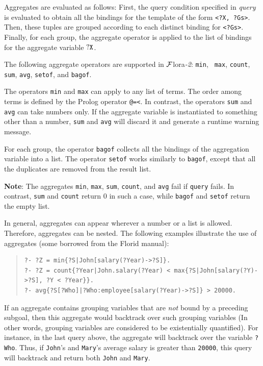 \documentclass[11pt]{article}
\newcommand{\FLSYSTEM}{{\mbox{\sc ${\cal F}${lora}\rm\emph{-2}}}\xspace}
\newcommand{\FLORID}{{\mbox{\sc Florid}}\xspace}
\begin{document}
Aggregates are evaluated as follows: First, the query
condition specified in {\it query} is evaluated to obtain all the bindings
for the template of the form {\tt \texttt{<}?X, ?Gs\texttt{>}}. Then, these
tuples are grouped according to each distinct binding for
{\tt \texttt{<}?Gs\texttt{>}}. Finally, for each group, the aggregate operator
is applied to the list of bindings for the aggregate variable $\tt ?X$.


%
The following aggregate operators are supported in \FLSYSTEM: {\tt min}, {\tt
  max}, {\tt count}, {\tt sum}, {\tt avg}, {\tt setof},
  and {\tt bagof}. 

The operators {\tt min} and {\tt max} can apply to any list of
terms. The order among terms is defined by the Prolog operator {\tt @=<}.  In
contrast, the operators {\tt sum} and {\tt avg} can take numbers only. If
the aggregate variable is instantiated to something other than a
number, {\tt sum} and {\tt avg} will discard it and generate a runtime
warning message.

For each group, the operator {\tt bagof} collects all the bindings of
the aggregation variable into a list. The operator {\tt setof} works
similarly to {\tt bagof}, except that all the duplicates are removed
from the result list.


\textbf{Note}: 
The aggregates {\tt min}, {\tt max}, {\tt sum}, {\tt count}, and {\tt avg}
fail if {\tt query} fails.
In contrast, \texttt{sum} and \texttt{count} return 0 in such a case, while  
{\tt bagof} and {\tt setof}
  return the
empty list.

In general, aggregates can appear wherever a number or a list is
allowed. Therefore, aggregates can be nested. The following examples
illustrate the use of aggregates (some borrowed from the \FLORID manual):
\begin{quote}
\begin{verbatim}
?- ?Z = min{?S|John[salary(?Year)->?S]}.
?- ?Z = count{?Year|John.salary(?Year) < max{?S|John[salary(?Y)->?S], ?Y < ?Year}}.
?- avg{?S[?Who]|?Who:employee[salary(?Year)->?S]} > 20000. 
\end{verbatim}
\end{quote}
If an aggregate contains grouping variables that are \emph{not} bound
by a preceding subgoal, then this aggregate would backtrack over such
grouping variables (In other words, grouping variables are considered to be
existentially quantified). For instance, in the last query above, the
aggregate will backtrack over the variable {\tt ?Who}. Thus, if
{\tt John}'s and {\tt Mary}'s average salary is greater than {\tt 20000},
this query will backtrack and return both {\tt John} and {\tt Mary}.
\end{document}
